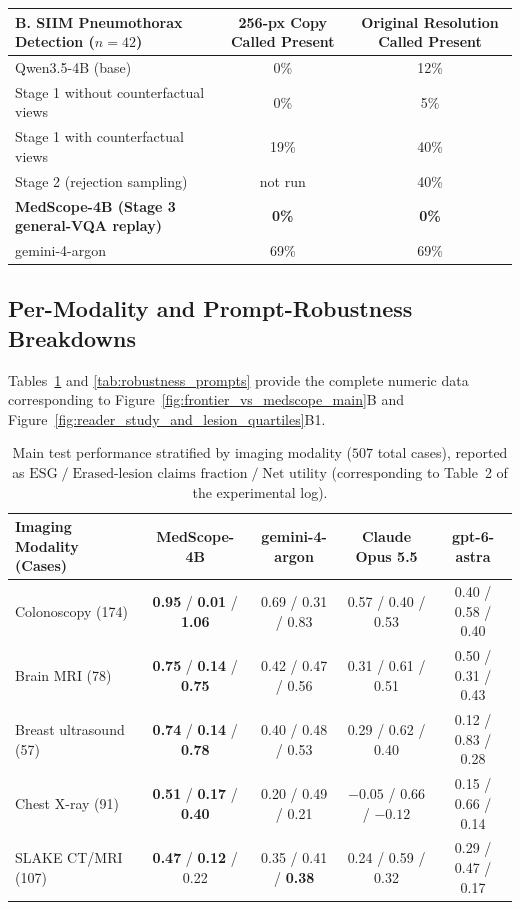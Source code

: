 \documentclass{article} %
\begin{document}
\begin{table}[h]
\begin{center}
\vspace{0.2cm}
\begin{tabular}{lcc}
\toprule
\textbf{B. SIIM Pneumothorax Detection ($n=42$)} & \textbf{256-px Copy Called Present} & \textbf{Original Resolution Called Present} \\
\midrule
Qwen3.5-4B (base) & 0\% & 12\% \\
Stage 1 without counterfactual views & 0\% & 5\% \\
Stage 1 with counterfactual views & 19\% & 40\% \\
Stage 2 (rejection sampling) & not run & 40\% \\
\textbf{MedScope-4B (Stage 3 general-VQA replay)} & \textbf{0\%} & \textbf{0\%} \\
gemini-4-argon & 69\% & 69\% \\
\bottomrule
\end{tabular}
\end{center}
\end{table}

\subsection{Per-Modality and Prompt-Robustness Breakdowns}
Tables~\ref{tab:modality_breakdown} and \ref{tab:robustness_prompts} provide the complete numeric data corresponding to Figure~\ref{fig:frontier_vs_medscope_main}B and Figure~\ref{fig:reader_study_and_lesion_quartiles}B1.

\begin{table}[h]
\caption{Main test performance stratified by imaging modality ($507$ total cases), reported as $\text{ESG} \;/\; \text{Erased-lesion claims fraction} \;/\; \text{Net utility}$ (corresponding to Table~2 of the experimental log).}
\label{tab:modality_breakdown}
\begin{center}
\small
\begin{tabular}{lcccc}
\toprule
\textbf{Imaging Modality (Cases)} & \textbf{MedScope-4B} & \textbf{gemini-4-argon} & \textbf{Claude Opus 5.5} & \textbf{gpt-6-astra} \\
\midrule
Colonoscopy (174) & \textbf{0.95} / \textbf{0.01} / \textbf{1.06} & 0.69 / 0.31 / 0.83 & 0.57 / 0.40 / 0.53 & 0.40 / 0.58 / 0.40 \\
Brain MRI (78) & \textbf{0.75} / \textbf{0.14} / \textbf{0.75} & 0.42 / 0.47 / 0.56 & 0.31 / 0.61 / 0.51 & 0.50 / 0.31 / 0.43 \\
Breast ultrasound (57) & \textbf{0.74} / \textbf{0.14} / \textbf{0.78} & 0.40 / 0.48 / 0.53 & 0.29 / 0.62 / 0.40 & 0.12 / 0.83 / 0.28 \\
Chest X-ray (91) & \textbf{0.51} / \textbf{0.17} / \textbf{0.40} & 0.20 / 0.49 / 0.21 & $-0.05$ / 0.66 / $-0.12$ & 0.15 / 0.66 / 0.14 \\
SLAKE CT/MRI (107) & \textbf{0.47} / \textbf{0.12} / 0.22 & 0.35 / 0.41 / \textbf{0.38} & 0.24 / 0.59 / 0.32 & 0.29 / 0.47 / 0.17 \\
\bottomrule
\end{tabular}
\end{center}
\end{table}
\end{document}
